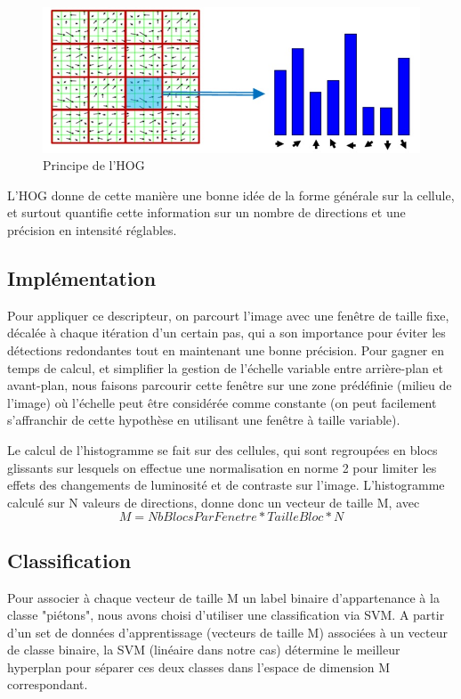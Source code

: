 \documentclass{article}
\begin{document}
	\begin{figure}[hh]
		\begin{center}			
			\includegraphics[scale=0.3]{Img/HOGtheory}
		\end{center}
		\caption{Principe de l'HOG}
	\end{figure}

	L'HOG donne de cette manière une bonne idée de la forme générale sur la cellule, et surtout quantifie cette information sur un nombre de directions et une précision en intensité réglables.
	
	\subsection{Implémentation}
	Pour appliquer ce descripteur, on parcourt l'image avec une fenêtre de taille fixe, décalée à chaque itération d'un certain pas, qui a son importance pour éviter les détections redondantes tout en maintenant une bonne précision. Pour gagner en temps de calcul, et simplifier la gestion de l'échelle variable entre arrière-plan et avant-plan, nous faisons parcourir cette fenêtre sur une zone prédéfinie (milieu de l'image) où l'échelle peut être considérée comme constante (on peut facilement s'affranchir de cette hypothèse en utilisant une fenêtre à taille variable).
	
	
	Le calcul de l'histogramme se fait sur des cellules, qui sont regroupées en blocs glissants sur lesquels on effectue une normalisation en norme 2 pour limiter les effets des changements de luminosité et de contraste sur l'image.
	L'histogramme calculé sur N valeurs de directions, donne donc un vecteur de taille M, avec 
	$$ M = NbBlocsParFenetre * TailleBloc * N $$
 	
	\subsection{Classification}

	Pour associer à chaque vecteur de taille M un label binaire d'appartenance à la classe "piétons", nous avons choisi d'utiliser une classification via SVM. A partir d'un set de données d'apprentissage (vecteurs de taille M) associées à un vecteur de classe binaire, la SVM (linéaire dans notre cas) détermine le meilleur hyperplan pour séparer ces deux classes dans l'espace de dimension M correspondant.
	
\end{document}
